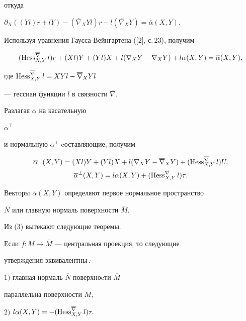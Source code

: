 откуда


$\partial_{X}((Yl)r+lY)-(\overline{\nabla}_{X}Y l)r-


l(\overline{\nabla}_{X}Y)=


\overline{\alpha}(X,Y)$.


Используя уравнения Гаусса-Вейнгартена ([2], с.\,23), получим


$$


(\Hess_{X,Y}^{\overline{\nabla}}l)r+(Xl)Y+(Yl)X+


l(\nabla_{X}Y-\overline{\nabla}_{X}Y)+


l\alpha(X,Y)=\overline{\alpha}(X,Y),


$$


где $\operatorname{Hess}_{X,Y}^{\overline{\nabla}}l=XYl-\overline{\nabla}_{X}Y l$


--- гессиан функции $l$ в связности $\overline{\nabla}$.


Разлагая $\overline{\alpha}$ на касательную


$\overline{\alpha}^{\top}$


и нормальную $\overline{\alpha}^{\bot}$ cоставляющие, получим


\begin{gather}


\overline{\alpha}^{\top}(X,Y)=(Xl)Y+(Yl)X+


l(\nabla_{X}Y-\overline{\nabla}_{X}Y)+


(\Hess_{X,Y}^{\overline{\nabla}}l)U, \\


%


\overline{\alpha}^{\bot}(X,Y)=


l\alpha(X,Y)+ (\Hess_{X,Y}^{\overline{\nabla}}l)\tau.\notag


\end{gather}


Векторы $\overline{\alpha}(X,Y)$ определяют первое нормальное пространство


$\overline{N}$ или главную нормаль поверхности $\overline{M}$.


Из (3) вытекают следующие теоремы.    





\begin{thm}


Если $f: M \rightarrow \overline{M}$  --- центральная проекция, то следующие


утверждения эквивалентны\,{\em :}





$1)$ главная нормаль $\overline{N}$ поверхноcти $\overline{M}$


параллельна поверхности $M$,





$2)$ $l\alpha(X,Y)=-(\operatorname{Hess}_{X,Y}^{\overline{\nabla}}l)\tau.$


\end{thm}





